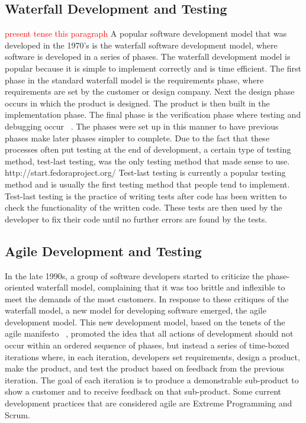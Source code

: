 \documentclass{sig-alternate}
\newcommand{\mycomment}[1]{\textcolor{red}{#1}}
\begin{document}
\subsection{Waterfall Development and Testing}
\mycomment{present tense this paragraph}
A popular software development model that was developed in the 1970's is the waterfall software development model, where software is developed in a series of phases.  The waterfall development model is popular because it is simple to implement correctly and is time efficient. The first phase in the standard waterfall model is the requirements phase, where requirements are set by the customer or design company.  Next the design phase occurs in which the product is designed. The product is then built in the implementation phase.  The final phase is the verification phase where testing and debugging occur ~\cite{wiki:xxx}.  The phases were set up in this manner to have previous phases make later phases simpler to complete.  Due to the fact that these processes often put testing at the end of development, a certain type of testing method, test-last testing, was the only testing method that made sense to use.
http://start.fedoraproject.org/
Test-last testing is currently a popular testing method and is usually the first testing method that people tend to implement.  Test-last testing is the practice of writing tests after code has been written to check the functionality of the written code.  These tests are then used by the developer to fix their code until no further errors are found by the tests.

\subsection{Agile Development and Testing}

In the late 1990s, a group of software developers started to criticize the phase-oriented waterfall model, complaining that it was too brittle and inflexible to meet the demands of the most customers.  In response to these critiques of the waterfall model, a new model for developing software emerged, the agile development model.  This new development model, based on the tenets of the agile manifesto ~\cite{agile:xxx}, promoted the idea that all actions of development should not occur within an ordered sequence of phases, but instead a series of time-boxed iterations where, in each iteration, developers set requirements, design a product, make the product, and test the product based on feedback from the previous iteration.  The goal of each iteration is to produce a demonstrable sub-product to show a customer and to receive feedback on that sub-product.  Some current development practices that are considered agile are Extreme Programming and Scrum.
\end{document}
